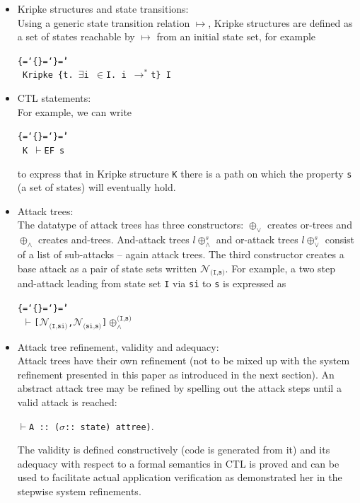 \documentclass{llncs}
\newenvironment{ttbox}{\begin{alltt}\ttbraces\small\tt}%
                      {\end{alltt}}
\def\ttbraces{\let\.=\nobreak\chardef\{=`\{\chardef\}=`\}\chardef\|=`\\}
\newcommand\ttexists{\mbox{{$\exists$}}}
\newcommand\ttin{\mbox{{$\in$}}}
\newcommand\ttrelIstar{\mbox{{$\to^*$}}}
\newcommand\ttvdash{\mbox{{$\vdash$}}}
\newcommand{\ttcalN}[1]{\mbox{{${\mathcal{N}}_{\texttt{#1}}$}}}
\newcommand\ttattand[1]{\mbox{{$\oplus_{\wedge}^{#1}$}}}
\newcommand\ttattor[1]{\mbox{{$\oplus_{\vee}^{#1}$}}}
\newcommand\ttsigma{\mbox{{$\sigma$}}}
\begin{document}
\begin{itemize}
\item {Kripke structures and state transitions:}\\ 
Using a generic state transition relation $\mapsto$, Kripke structures
are defined as a set of states reachable by $\mapsto$ from an initial
state set, for example
\begin{ttbox}
Kripke \{t. \ttexists i \ttin I. i \ttrelIstar t\} I
\end{ttbox}
\item {CTL statements:}\\ 
For example, we can write 
\begin{ttbox}
K \ttvdash {\sf EF} s
\end{ttbox}
to express that in Kripke structure \texttt{K} there is a path on which
the property \texttt{s} (a set of states) will eventually hold.
\item {Attack trees:} \\
The datatype of attack trees has three constructors: 
$\oplus_\vee$ creates or-trees and $\oplus_\wedge$ creates 
and-trees.
And-attack trees $l \ttattand s$ and or-attack trees $l \ttattor s$ 
consist of a list of sub-attacks -- again attack trees. The third constructor 
creates a base attack as a pair of state sets written \texttt{\ttcalN{(I,s)}}.
For example, a two step and-attack leading from state set \texttt{I} via
\texttt{si} to \texttt{s} is expressed as
\begin{ttbox}
\ttvdash [\ttcalN{(I,si)},\ttcalN{(si,s)}]\ttattand{\texttt{(I,s)}}
\end{ttbox}
\item {Attack tree refinement, validity and adequacy:}\\
Attack trees have their own refinement (not to be mixed up with the
system refinement presented in this paper as introduced in the next section).
An abstract attack tree may be refined by spelling out the attack steps until a valid attack
is reached:

\texttt{\ttvdash A :: (\ttsigma :: state) attree)}.

The validity is defined constructively (code is generated from it)
and its adequacy with respect to a formal semantics in CTL is proved
and can be used to facilitate actual application verification as demonstrated 
her in the stepwise system refinements.
\end{itemize}
\end{document}
